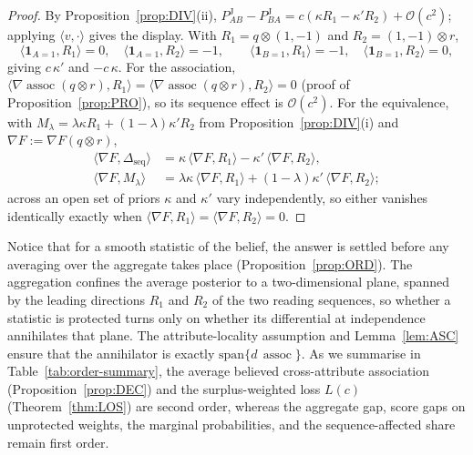 \documentclass[a4paper,fleqn]{cas-sc}
\theoremstyle{remark}
\theoremstyle{definition}
\newcommand{\PJ}{P^{\mathrm{J}}}
\newcommand{\assoc}{\operatorname{assoc}}
\newcommand{\bigO}{\mathcal{O}}
\begin{document}
\begin{proof}
By Proposition~\ref{prop:DIV}(ii), $\PJ_{AB}-\PJ_{BA}=c(\kappa R_1-\kappa'R_2)+\bigO(c^{2})$;
applying $\langle v,\cdot\rangle$ gives the display. With $R_1=q\otimes(1,-1)$
and $R_2=(1,-1)\otimes r$,
\[
  \langle\mathbf 1_{A=1},R_1\rangle=0,\quad
  \langle\mathbf 1_{A=1},R_2\rangle=-1,\qquad
  \langle\mathbf 1_{B=1},R_1\rangle=-1,\quad
  \langle\mathbf 1_{B=1},R_2\rangle=0,
\]
giving $c\,\kappa'$ and $-c\,\kappa$. For the association,
$\langle\nabla\assoc(q\otimes r),R_1\rangle=\langle\nabla\assoc(q\otimes r),R_2\rangle=0$
(proof of Proposition~\ref{prop:PRO}), so its sequence effect is
$\bigO(c^{2})$. For the equivalence, with
$M_\lambda=\lambda\kappa R_1+(1-\lambda)\kappa'R_2$ from
Proposition~\ref{prop:DIV}(i) and $\nabla F:=\nabla F(q\otimes r)$,
\[
\begin{aligned}
  \langle\nabla F,\Delta_{\mathrm{seq}}\rangle
    &=\kappa\,\langle\nabla F,R_1\rangle-\kappa'\,\langle\nabla F,R_2\rangle,\\
  \langle\nabla F,M_\lambda\rangle
    &=\lambda\kappa\,\langle\nabla F,R_1\rangle+(1-\lambda)\kappa'\,\langle\nabla F,R_2\rangle;
\end{aligned}
\]
across an open set of priors $\kappa$ and $\kappa'$ vary independently, so
either vanishes identically exactly when
$\langle\nabla F,R_1\rangle=\langle\nabla F,R_2\rangle=0$.
\end{proof}

Notice that for a smooth statistic of the belief,
the answer is settled before any averaging over the aggregate takes place
(Proposition~\ref{prop:ORD}). The aggregation confines the average posterior to a two-dimensional plane, spanned by the leading directions $R_1$ and $R_2$ of the two reading sequences, so whether a statistic is protected turns only on whether its differential at independence annihilates that plane. The attribute-locality assumption and Lemma~\ref{lem:ASC} ensure that the annihilator is exactly $\mathrm{span}\{d\,\assoc\}$. As we summarise in Table~\ref{tab:order-summary}, the average believed cross-attribute association
(Proposition~\ref{prop:DEC}) and the surplus-weighted loss $L(c)$ (Theorem~\ref{thm:LOS}) are
second order, whereas the aggregate gap, score gaps on unprotected weights, the marginal
probabilities, and the sequence-affected share remain first order.
\end{document}
